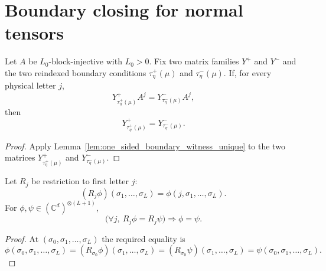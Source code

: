 \section{Boundary closing for normal tensors}\label{sec:normal_boundary_closing}

\begin{lemma}
    \label{lem:wrapped_mirror_right_products_determine}
    \leanok
    Let $A$ be $L_0$-block-injective with $L_0>0$.  Fix two matrix
    families $Y^+$ and $Y^-$ and the two reindexed boundary conditions
    $\tau^+_\eta(\mu)$ and $\tau^-_\eta(\mu)$.  If, for every physical letter
    $j$,
    \[
        Y^+_{\tau^+_\eta(\mu)} A^j
        =
        Y^-_{\tau^-_\eta(\mu)} A^j,
    \]
    then
    \[
        Y^+_{\tau^+_\eta(\mu)}
        =
        Y^-_{\tau^-_\eta(\mu)}.
    \]
\end{lemma}

\begin{proof}
    \leanok
    Apply Lemma~\ref{lem:one_sided_boundary_witness_unique} to the two
    matrices $Y^+_{\tau^+_\eta(\mu)}$ and $Y^-_{\tau^-_\eta(\mu)}$.
\end{proof}

\begin{lemma}
    \label{lem:first_letter_restrictions_determine}
    \leanok
    Let $R_j$ be restriction to first letter $j$:
    \[
        (R_j\phi)(\sigma_1,\ldots,\sigma_L)
        =
        \phi(j,\sigma_1,\ldots,\sigma_L).
    \]
    For $\phi,\psi\in(\mathbb C^d)^{\otimes(L+1)}$,
    \[
        \bigl(\forall j,\ R_j\phi=R_j\psi\bigr)
        \Longrightarrow
        \phi=\psi .
    \]
\end{lemma}

\begin{proof}
    \leanok
    At $(\sigma_0,\sigma_1,\ldots,\sigma_L)$ the required equality is
    \[
        \phi(\sigma_0,\sigma_1,\ldots,\sigma_L)
        =
        (R_{\sigma_0}\phi)(\sigma_1,\ldots,\sigma_L)
        =
        (R_{\sigma_0}\psi)(\sigma_1,\ldots,\sigma_L)
        =
        \psi(\sigma_0,\sigma_1,\ldots,\sigma_L).
    \]
\end{proof}

